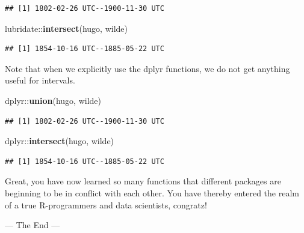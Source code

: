 \documentclass[]{tufte-book}
\newenvironment{Shaded}{}{}
\newcommand{\KeywordTok}[1]{\textcolor[rgb]{0.00,0.44,0.13}{\textbf{#1}}}
\newcommand{\NormalTok}[1]{#1}
\newcommand{\OperatorTok}[1]{\textcolor[rgb]{0.40,0.40,0.40}{#1}}
\begin{document}
\begin{verbatim}
## [1] 1802-02-26 UTC--1900-11-30 UTC
\end{verbatim}

\begin{Shaded}
\begin{Highlighting}[]
\NormalTok{lubridate}\OperatorTok{::}\KeywordTok{intersect}\NormalTok{(hugo, wilde)}
\end{Highlighting}
\end{Shaded}

\begin{verbatim}
## [1] 1854-10-16 UTC--1885-05-22 UTC
\end{verbatim}

Note that when we explicitly use the dplyr functions, we do not get anything useful for intervals.

\begin{Shaded}
\begin{Highlighting}[]
\NormalTok{dplyr}\OperatorTok{::}\KeywordTok{union}\NormalTok{(hugo, wilde)}
\end{Highlighting}
\end{Shaded}

\begin{verbatim}
## [1] 1802-02-26 UTC--1900-11-30 UTC
\end{verbatim}

\begin{Shaded}
\begin{Highlighting}[]
\NormalTok{dplyr}\OperatorTok{::}\KeywordTok{intersect}\NormalTok{(hugo, wilde)}
\end{Highlighting}
\end{Shaded}

\begin{verbatim}
## [1] 1854-10-16 UTC--1885-05-22 UTC
\end{verbatim}

Great, you have now learned so many functions that different packages are beginning to be in conflict with each other. You have thereby entered the realm of a true R-programmers and data scientists, congratz!

--- The End ---


\end{document}

